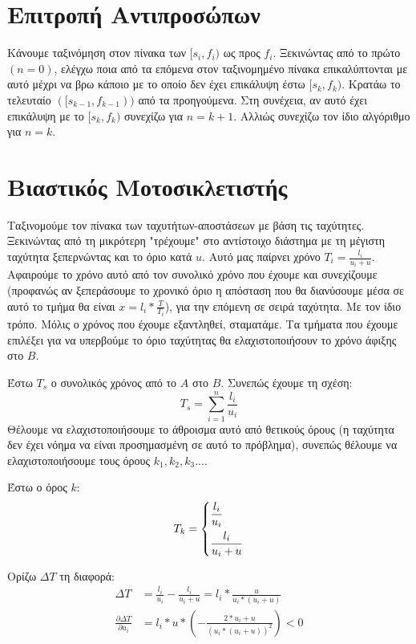 \documentclass[a4paper,10pt]{article} \usepackage{anysize}
\begin{document}
\def\thesubsection {\alph{subsection}}
\renewcommand{\labelenumi}{\roman{enumi})}
\renewcommand{\labelenumii}{(\arabic{enumii})}



\section{Επιτροπή Αντιπροσώπων} \setcounter{section}{1}
Κάνουμε ταξινόμηση στον πίνακα των $[s_i,f_i)$ ως προς $f_i$. Ξεκινώντας από
 το πρώτο $(n=0)$, ελέγχω ποια από τα επόμενα στον ταξινομημένο πίνακα επικαλύπτονται
με αυτό μέχρι να βρω κάποιο με το οποίο δεν έχει επικάλυψη έστω $[s_k,f_k)$. Κρατάω
το τελευταίο $([s_{k-1},f_{k-1}))$ από τα προηγούμενα. Στη συνέχεια, αν αυτό έχει
επικάλυψη με το $[s_k,f_k)$ συνεχίζω για $n=k+1$. Αλλιώς συνεχίζω
τον ίδιο αλγόριθμο για $n=k$.%

\section{Βιαστικός Μοτοσικλετιστής}
Ταξινομούμε τον πίνακα των ταχυτήτων-αποστάσεων με βάση τις ταχύτητες.
Ξεκινώντας από τη μικρότερη "τρέχουμε" στο αντίστοιχο διάστημα με τη μέγιστη
ταχύτητα ξεπερνώντας και το όριο κατά $u$. Αυτό μας παίρνει χρόνο
$T_i=\frac{l_i}{u_i+u}$. Αφαιρούμε το χρόνο αυτό από τον συνολικό χρόνο που
έχουμε και συνεχίζουμε (προφανώς αν ξεπεράσουμε το χρονικό όριο η απόσταση που
θα διανύσουμε μέσα σε αυτό το τμήμα θα είναι $x=l_i*\frac{T}{T_i}$), για την
επόμενη σε σειρά ταχύτητα. Με τον ίδιο τρόπο. Μόλις ο χρόνος που έχουμε
εξαντληθεί, σταματάμε. Τα τμήματα που έχουμε επιλέξει για να υπερβούμε το όριο
ταχύτητας θα ελαχιστοποιήσουν το χρόνο άφιξης στο $B$.

Έστω $T_s$ ο συνολικός χρόνος από το $A$ στο $B$. Συνεπώς έχουμε τη σχέση:
\[
T_s=\sum_{i=1}^n{\frac{l_i}{u_i}}
\]
Θέλουμε να ελαχιστοποιήσουμε το άθροισμα αυτό από θετικούς όρους (η ταχύτητα
δεν έχει νόημα να είναι προσημασμένη σε αυτό το πρόβλημα), συνεπώς θέλουμε να
ελαχιστοποιήσουμε τους όρους $k_1, k_2, k_3 ...$.

Έστω ο όρος $k$:
\[
T_k=
	\begin{dcases}
	\frac{l_i}{u_i} \\
	\frac{l_i}{u_i+u}  
	\end{dcases}
\]

Ορίζω $\Delta{T}$ τη διαφορά:
\begin{align*}
	\Delta{T}&=\frac{l_i}{u_i} - \frac{l_i}{u_i+u} =
	l_i*\frac{u}{u_i*(u_i+u)}\\
	\frac{\partial{\Delta{T} }}{\partial{u_i}} &=
	l_i*u*(-\frac{2*u_i+u}{(u_i*(u_i+u))^2}) < 0
\end{align*}
\end{document}
